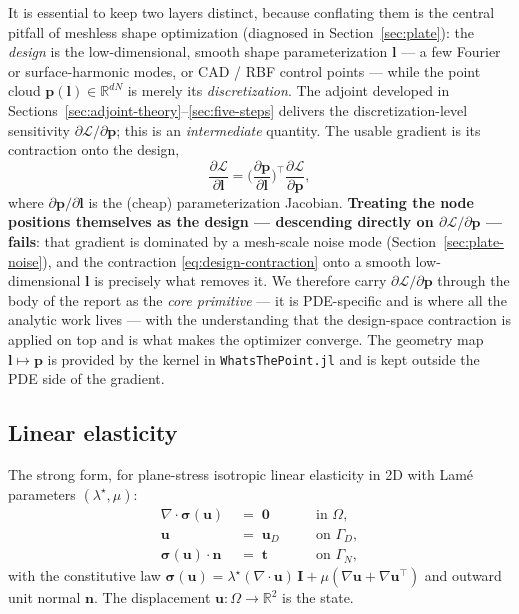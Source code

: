 \documentclass[11pt,a4paper]{article}
\newcommand{\mat}[1]{\mathbf{#1}}
\newcommand{\vect}[1]{\boldsymbol{#1}}
\newcommand{\pts}{\vect{p}}
\newcommand{\reals}{\mathbb{R}}
\newcommand{\Loss}{\mathcal{L}}
\begin{document}
It is essential to keep two layers distinct, because conflating them is the
central pitfall of meshless shape optimization (diagnosed in
Section~\ref{sec:plate}): the \emph{design} is the low-dimensional, smooth shape
parameterization $\vect l$ --- a few Fourier or surface-harmonic modes, or CAD /
RBF control points --- while the point cloud $\pts(\vect l) \in \reals^{dN}$ is
merely its \emph{discretization}. The adjoint developed in
Sections~\ref{sec:adjoint-theory}--\ref{sec:five-steps} delivers the
discretization-level sensitivity $\partial\Loss/\partial\pts$; this is an
\emph{intermediate} quantity. The usable gradient is its contraction onto the
design,
\begin{equation}
  \frac{\partial\Loss}{\partial\vect l}
   = \Big(\frac{\partial\pts}{\partial\vect l}\Big)^{\!\top}
     \frac{\partial\Loss}{\partial\pts},
  \label{eq:design-contraction}
\end{equation}
where $\partial\pts/\partial\vect l$ is the (cheap) parameterization Jacobian.
\textbf{Treating the node positions themselves as the design --- descending
directly on $\partial\Loss/\partial\pts$ --- fails}: that gradient is dominated by
a mesh-scale noise mode (Section~\ref{sec:plate-noise}), and the contraction
\eqref{eq:design-contraction} onto a smooth low-dimensional $\vect l$ is precisely
what removes it. We therefore carry $\partial\Loss/\partial\pts$ through the body of
the report as the \emph{core primitive} --- it is PDE-specific and is where all the
analytic work lives --- with the understanding that the design-space contraction is
applied on top and is what makes the optimizer converge. The geometry map
$\vect l \mapsto \pts$ is provided by the kernel in \texttt{WhatsThePoint.jl} and is
kept outside the PDE side of the gradient.

\subsection{Linear elasticity}

The strong form, for plane-stress isotropic linear elasticity in 2D
with Lamé parameters $(\lambda^\star, \mu)$:
\begin{align}
  \nabla \!\cdot\! \vect\sigma(\vect u) \;&=\; \vect 0
    \quad &&\text{in } \Omega, \\
  \vect u \;&=\; \vect u_D
    \quad &&\text{on } \Gamma_D, \\
  \vect\sigma(\vect u)\!\cdot\!\vect n \;&=\; \vect t
    \quad &&\text{on } \Gamma_N,
\end{align}
with the constitutive law
$\vect\sigma(\vect u) = \lambda^\star(\nabla\!\cdot\!\vect u)\,\mat I
  + \mu(\nabla\vect u + \nabla\vect u^\top)$ and outward unit normal
$\vect n$. The displacement $\vect u: \Omega \to \reals^2$ is the
state.
\end{document}
